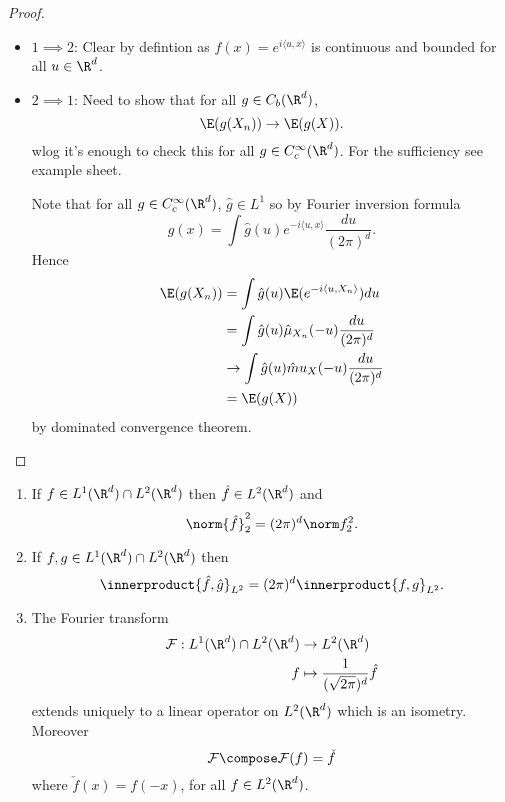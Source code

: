 \documentclass[a4paper]{article}
\newcommand*{\ip}{\innerproduct} %
\begin{document}
\begin{proof}\leavevmode
  \begin{itemize}
  \item \(1 \implies 2\): Clear by defintion as \(f(x) = e^{i \langle u, x \rangle}\) is continuous and bounded for all \(u \in \R^d\).
  \item \(2 \implies 1\): Need to show that for all \(g \in C_b(\R^d)\),
    \[
      \E(g(X_n)) \to \E(g(X)).
    \]
    wlog it's enough to check this for all \(g \in C_c^\infty(\R^d)\). For the sufficiency see example sheet.

    Note that for all \(g \in C_c^\infty(\R^d)\), \(\hat g \in L^1\) so by Fourier inversion formula
    \[
      g(x) = \int \hat g(u) e^{-i \langle u, x\rangle} \frac{du}{(2\pi)^d}.
    \]
    Hence
    \begin{align*}
      \E(g(X_n))
      &= \int \hat g(u) \E(e^{-i \langle u, X_n \rangle}) du \\
      &= \int \hat g(u) \hat \mu_{X_n} (-u) \frac{du}{(2\pi)^d} \\
      &\to \int \hat g(u) \hat mu_X(-u) \frac{du}{(2\pi)^d} \\
      &= \E(g(X))
    \end{align*}
    by dominated convergence theorem.
  \end{itemize}
\end{proof}


\begin{theorem}\leavevmode
  \begin{enumerate}
  \item If \(f \in L^1(\R^d) \cap L^2(\R^d)\) then \(\hat f \in L^2(\R^d)\) and
    \[
      \norm{\hat f}^2_2 = (2\pi)^d \norm f^2_2.
    \]
  \item If \(f, g \in L^1(\R^d) \cap L^2(\R^d)\) then
    \[
      \ip{\hat f, \hat g}_{L^2} = (2\pi)^d \ip{f, g}_{L^2}.
    \]
  \item The Fourier transform
    \begin{align*}
      \mathcal F: L^1(\R^d) \cap L^2(\R^d) &\to L^2(\R^d) \\
      f &\mapsto \frac{1}{(\sqrt{2\pi})^d} \hat f
    \end{align*}
    extends uniquely to a linear operator on \(L^2(\R^d)\) which is an isometry. Moreover
    \[
      \mathcal F \compose \mathcal F (f) = \check f
    \]
    where \(\check f(x) = f(-x)\), for all \(f \in L^2(\R^d)\).
  \end{enumerate}
\end{theorem}
\end{document}
